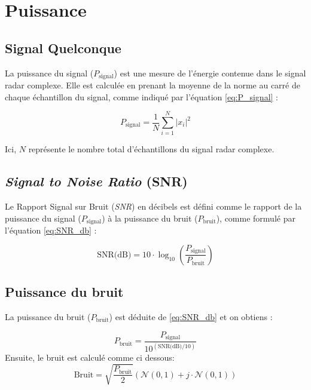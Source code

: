 \chapter{Puissance}

 \section{Signal Quelconque}
 
La puissance du signal (\(P_{\text{signal}}\)) est une mesure de l'énergie contenue dans le signal radar complexe. Elle est calculée en prenant la moyenne de la norme au carré de chaque échantillon du signal, comme indiqué par l'équation \ref{eq:P_signal} :

\begin{equation}
    P_{\text{signal}} = \frac{1}{N} \sum_{i=1}^{N} |x_i|^2
    \label{eq:P_signal}
\end{equation}

Ici, \(N\) représente le nombre total d'échantillons du signal radar complexe.\\

\section{\textit{Signal to Noise Ratio } (SNR)}

Le Rapport Signal sur Bruit (\textit{SNR}) en décibels est défini comme le rapport de la puissance du signal (\(P_{\text{signal}}\)) à la puissance du bruit (\(P_{\text{bruit}}\)), comme formulé par l'équation \ref{eq:SNR_db} :

\begin{equation}
    \text{SNR(dB)} = 10 \cdot \log_{10} \left( \frac{P_{\text{signal}}}{P_{\text{bruit}}} \right)
    \label{eq:SNR_db}
\end{equation}

\section{Puissance du bruit}

La puissance du bruit (\(P_{\text{bruit}}\)) est déduite de \ref{eq:SNR_db} et on obtiens :

\begin{equation}
    P_{\text{bruit}} = \frac{P_{\text{signal}}}{10^{(\text{SNR(dB)}/10)}}
    \label{eq:p_bruit}
\end{equation}
Ensuite, le bruit est calculé comme ci dessous:
\begin{equation}
    \text{Bruit} = \sqrt{\frac{P_{\text{bruit}}}{2}} \left(\mathcal{N}(0, 1) + j \cdot \mathcal{N}(0, 1)\right)
    \label{eq:bruit_blanc}
\end{equation}

